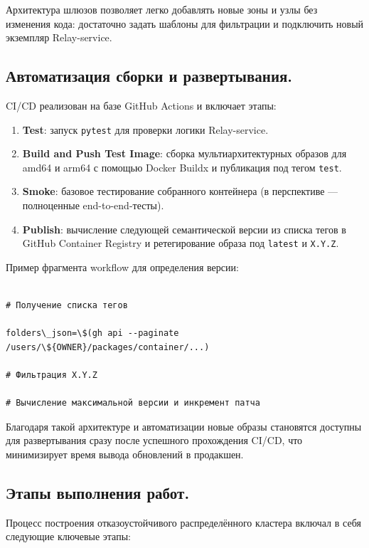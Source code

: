 \documentclass[14pt, a4paper]{extreport}
\begin{document}
Архитектура шлюзов позволяет легко добавлять новые зоны и узлы без изменения кода: достаточно задать шаблоны для фильтрации и подключить новый экземпляр Relay-service.

\subsection{Автоматизация сборки и развертывания.}

CI/CD реализован на базе GitHub Actions и включает этапы:

\begin{enumerate}
  \item \textbf{Test}: запуск \texttt{pytest} для проверки логики Relay-service.
  \item \textbf{Build and Push Test Image}: сборка мультиархитектурных образов для amd64 и arm64 с помощью Docker Buildx и публикация под тегом \texttt{test}.
  \item \textbf{Smoke}: базовое тестирование собранного контейнера (в перспективе — полноценные end-to-end-тесты).
  \item \textbf{Publish}: вычисление следующей семантической версии из списка тегов в GitHub Container Registry и ретегирование образа под \texttt{latest} и \texttt{X.Y.Z}.
\end{enumerate}

Пример фрагмента workflow для определения версии:

\begin{verbatim}

# Получение списка тегов

folders\_json=\$(gh api --paginate /users/\${OWNER}/packages/container/...)

# Фильтрация X.Y.Z

# Вычисление максимальной версии и инкремент патча

\end{verbatim}

Благодаря такой архитектуре и автоматизации новые образы становятся доступны для развертывания сразу после успешного прохождения CI/CD, что минимизирует время вывода обновлений в продакшен.

\subsection{Этапы выполнения работ.}

Процесс построения отказоустойчивого распределённого кластера включал в себя следующие ключевые этапы:
\end{document}
